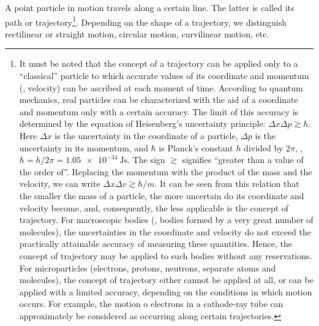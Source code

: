 A point particle in motion travels along a certain line. The latter is called its path or trajectory\footnote{It must be noted that the concept of a trajectory can be applied only to a ``classical'' particle to which accurate values of its coordinate and momentum (\ie, velocity) can be ascribed at each moment of time. According to quantum mechanics, real particles can be characterized with the aid of a coordinate and momentum only with a certain accuracy. The limit of this accuracy is determined by the equation of Heisenberg's uncertainty principle: $\Delta x\Delta p\gtrsim\hbar$. Here $\Delta x$ is the uncertainty in the coordinate of a particle, $\Delta p$ is the uncertainty in its momentum, and $\hbar$ is Planck's constant $h$ divided by $2\pi$, \ie, $\hbar = h/2\pi = \SI{1.05e-34}{\joule\second}$. The sign $\gtrsim$ signifies ``greater than a value of the order of''. Replacing the momentum with the product of the mass and the velocity, we can write $\Delta x\Delta v\gtrsim\hbar/m$. It can be seen from this relation that the smaller the mass of a particle, the more uncertain do its coordinate and velocity become, and, consequently, the less applicable is the concept of trajectory. For macroscopic bodies (\ie, bodies formed by a very great number of molecules), the uncertainties in the coordinate and velocity do not exceed the practically attainable accuracy of measuring these quantities. Hence, the concept of trajectory may be applied to such bodies without any reservations. For microparticles (electrons, protons, neutrons, separate atoms and molecules), the concept of trajectory either cannot be applied at all, or can be applied with a limited accuracy, depending on the conditions in which motion occurs. For example, the motion o electrons in a cathode-ray tube can approximately be considered as occurring along certain trajectories.}. Depending on the shape of a trajectory, we distinguish rectilinear or straight motion, circular motion, curvilinear motion, etc.

